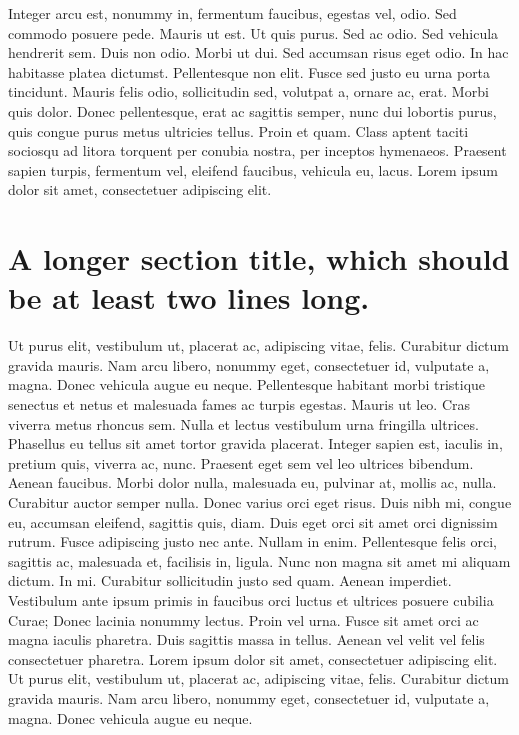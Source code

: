 \documentclass[draft,12pt,twoside,a4paper]{book}
\begin{document}
Integer arcu est, nonummy in, fermentum faucibus, egestas vel, odio.
Sed commodo posuere pede.
Mauris ut est.
Ut quis purus.
Sed ac odio.
Sed vehicula hendrerit sem.
Duis non odio.
Morbi ut dui.
Sed accumsan risus eget odio.
In hac habitasse platea dictumst.
Pellentesque non elit.
Fusce sed justo eu urna porta tincidunt.
Mauris felis odio, sollicitudin sed, volutpat a, ornare ac, erat.
Morbi quis dolor.
Donec pellentesque, erat ac sagittis semper, nunc dui lobortis purus,
 quis congue purus metus ultricies tellus.
Proin et quam.
Class aptent taciti sociosqu ad litora torquent per conubia nostra,
 per inceptos hymenaeos.
Praesent sapien turpis, fermentum vel, eleifend faucibus, vehicula eu, lacus.
Lorem ipsum dolor sit amet, consectetuer adipiscing elit.

\section{A longer section title, which should be at least two lines long.}
Ut purus elit, vestibulum ut, placerat ac, adipiscing vitae, felis.
Curabitur dictum gravida mauris.
Nam arcu libero, nonummy eget, consectetuer id, vulputate a, magna.
Donec vehicula augue eu neque.
Pellentesque habitant morbi tristique senectus et netus et malesuada
 fames ac turpis egestas.
Mauris ut leo.
Cras viverra metus rhoncus sem.
Nulla et lectus vestibulum urna fringilla ultrices.
Phasellus eu tellus sit amet tortor gravida placerat.
Integer sapien est, iaculis in, pretium quis, viverra ac, nunc.
Praesent eget sem vel leo ultrices bibendum.
Aenean faucibus.
Morbi dolor nulla, malesuada eu, pulvinar at, mollis ac, nulla.
Curabitur auctor semper nulla.
Donec varius orci eget risus.
Duis nibh mi, congue eu, accumsan eleifend, sagittis quis, diam.
Duis eget orci sit amet orci dignissim rutrum.
Fusce adipiscing justo nec ante.
Nullam in enim.
Pellentesque felis orci, sagittis ac, malesuada et, facilisis in, ligula.
Nunc non magna sit amet mi aliquam dictum.
In mi.
Curabitur sollicitudin justo sed quam.
Aenean imperdiet.
Vestibulum ante ipsum primis in faucibus orci luctus et ultrices
posuere cubilia Curae; Donec lacinia nonummy lectus.
Proin vel urna.
Fusce sit amet orci ac magna iaculis pharetra.
Duis sagittis massa in tellus.
Aenean vel velit vel felis consectetuer pharetra.
Lorem ipsum dolor sit amet, consectetuer adipiscing elit.
Ut purus elit, vestibulum ut, placerat ac, adipiscing vitae, felis.
Curabitur dictum gravida mauris.
Nam arcu libero, nonummy eget, consectetuer id, vulputate a, magna.
Donec vehicula augue eu neque.
\end{document}
